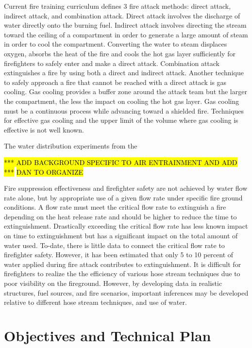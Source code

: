 \documentclass{article}
\begin{document}
Current fire training curriculum defines 3 fire attack methods: direct attack, indirect attack, and combination attack. Direct attack involves the discharge of water directly onto the burning fuel. Indirect attack involves directing the stream toward the ceiling of a compartment in order to generate a large amount of steam in order to cool the compartment. Converting the water to steam displaces oxygen, absorbs the heat of the fire and cools the hot gas layer sufficiently for firefighters to safely enter and make a direct attack. Combination attack extinguishes a fire by using both a direct and indirect attack. Another technique to safely approach a fire that cannot be reached with a direct attack is gas cooling. Gas cooling provides a buffer zone around the attack team but the larger the compartment, the less the impact on cooling the hot gas layer. Gas cooling must be a continuous process while advancing toward a shielded fire. Techniques for effective gas cooling and the upper limit of the volume where gas cooling is effective is not well known.  

The water distribution experiments from the 

\hl{*** ADD BACKGROUND SPECIFIC TO AIR ENTRAINMENT AND ADD ***}
\hl{DAN TO ORGANIZE}

Fire suppression effectiveness and firefighter safety are not achieved by water flow rate alone, but by appropriate use of a given flow rate under specific fire ground conditions. A flow rate must meet the critical flow rate to extinguish a fire depending on the heat release rate and should be higher to reduce the time to extinguishment. Drastically exceeding the critical flow rate has less known impact on time to extinguishment but has a significant impact on the total amount of water used. To-date, there is little data to connect the critical flow rate to firefighter safety. However, it has been estimated that only 5 to 10 percent of water applied during fire attack contributes to extinguishment. It is difficult for firefighters to realize the the efficiency of various hose stream techniques due to poor visibility on the fireground. However, by developing data in realistic structures, fuel sources, and fire scenarios, important inferences may be developed relative to different hose stream techniques, and use of water.

\clearpage

\section{Objectives and Technical Plan}
\end{document}
